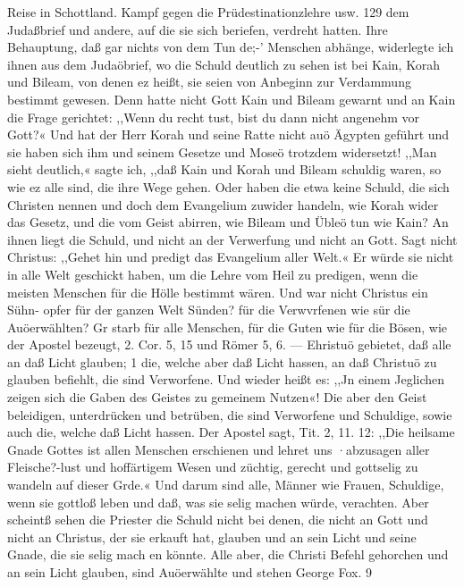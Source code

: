 Reise in Schottland. Kampf gegen die Prüdestinationzlehre usw. 129
dem Judaßbrief und andere, auf die sie sich beriefen, verdreht
hatten. Ihre Behauptung, daß gar nichts von dem Tun de;-’
Menschen abhänge, widerlegte ich ihnen aus dem Judaöbrief, wo
die Schuld deutlich zu sehen ist bei Kain, Korah und Bileam, von
denen ez heißt, sie seien von Anbeginn zur Verdammung bestimmt
gewesen. Denn hatte nicht Gott Kain und Bileam gewarnt und
an Kain die Frage gerichtet: ,,Wenn du recht tust, bist du dann
nicht angenehm vor Gott?« Und hat der Herr Korah und seine
Ratte nicht auö Ägypten geführt und sie haben sich ihm und
seinem Gesetze und Moseö trotzdem widersetzt! ,,Man sieht deutlich,«
sagte ich, ,,daß Kain und Korah und Bileam schuldig waren, so
wie ez alle sind, die ihre Wege gehen. Oder haben die etwa
keine Schuld, die sich Christen nennen und doch dem Evangelium
zuwider handeln, wie Korah wider das Gesetz, und die vom
Geist abirren, wie Bileam und Übleö tun wie Kain? An ihnen
liegt die Schuld, und nicht an der Verwerfung und nicht an Gott.
Sagt nicht Christus: ,,Gehet hin und predigt das Evangelium
aller Welt.« Er würde sie nicht in alle Welt geschickt haben, um
die Lehre vom Heil zu predigen, wenn die meisten Menschen für
die Hölle bestimmt wären. Und war nicht Christus ein Sühn-
opfer für der ganzen Welt Sünden? für die Verwvrfenen wie sür
die Auöerwählten? Gr starb für alle Menschen, für die Guten
wie für die Bösen, wie der Apostel bezeugt, 2. Cor. 5, 15 und
Römer 5, 6. — Ehristuö gebietet, daß alle an daß Licht glauben; 1
die, welche aber daß Licht hassen, an daß Christuö zu glauben
befiehlt, die sind Verworfene. Und wieder heißt es: ,,Jn einem
Jeglichen zeigen sich die Gaben des Geistes zu gemeinem Nutzen«!
Die aber den Geist beleidigen, unterdrücken und betrüben, die
sind Verworfene und Schuldige, sowie auch die, welche daß Licht
hassen. Der Apostel sagt, Tit. 2, 11. 12: ,,Die heilsame Gnade
Gottes ist allen Menschen erschienen und lehret uns ·abzusagen
aller Fleische?-lust und hoffärtigem Wesen und züchtig, gerecht und
gottselig zu wandeln auf dieser Grde.« Und darum sind alle,
Männer wie Frauen, Schuldige, wenn sie gottloß leben und daß,
was sie selig machen würde, verachten. Aber scheintß sehen die
Priester die Schuld nicht bei denen, die nicht an Gott und nicht
an Christus, der sie erkauft hat, glauben und an sein Licht und
seine Gnade, die sie selig mach en könnte. Alle aber, die Christi Befehl
gehorchen und an sein Licht glauben, sind Auöerwählte und stehen
George Fox. 9

